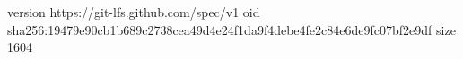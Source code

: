 version https://git-lfs.github.com/spec/v1
oid sha256:19479e90cb1b689c2738cea49d4e24f1da9f4debe4fe2c84e6de9fc07bf2e9df
size 1604
